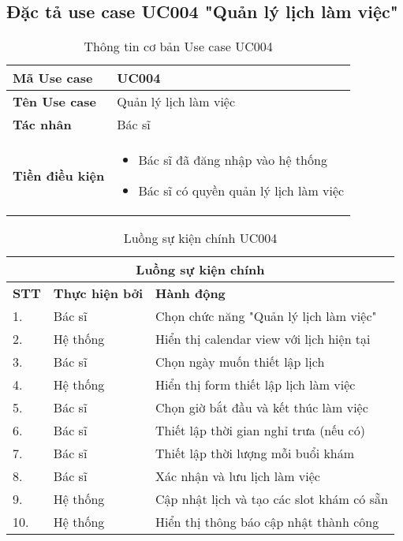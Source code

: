 \documentclass[../DoAn.tex]{subfiles}
\begin{document}
\subsection{Đặc tả use case UC004 "Quản lý lịch làm việc"}
\label{subsection:2.3.4}

\begin{table}[H]
\centering
\begin{tabular}{|p{3cm}|p{10cm}|}
\hline
\textbf{Mã Use case} & UC004 \\
\hline
\textbf{Tên Use case} & Quản lý lịch làm việc \\
\hline
\textbf{Tác nhân} & Bác sĩ \\
\hline
\textbf{Tiền điều kiện} & 
\begin{itemize}
    \item Bác sĩ đã đăng nhập vào hệ thống
    \item Bác sĩ có quyền quản lý lịch làm việc
\end{itemize} \\
\hline
\end{tabular}
\caption{Thông tin cơ bản Use case UC004}
\end{table}

\begin{table}[H]
\centering
\begin{tabular}{|p{1cm}|p{3cm}|p{9cm}|}
\hline
\multicolumn{3}{|c|}{\textbf{Luồng sự kiện chính}} \\
\hline
\textbf{STT} & \textbf{Thực hiện bởi} & \textbf{Hành động} \\
\hline
1. & Bác sĩ & Chọn chức năng "Quản lý lịch làm việc" \\
\hline
2. & Hệ thống & Hiển thị calendar view với lịch hiện tại \\
\hline
3. & Bác sĩ & Chọn ngày muốn thiết lập lịch \\
\hline
4. & Hệ thống & Hiển thị form thiết lập lịch làm việc \\
\hline
5. & Bác sĩ & Chọn giờ bắt đầu và kết thúc làm việc \\
\hline
6. & Bác sĩ & Thiết lập thời gian nghỉ trưa (nếu có) \\
\hline
7. & Bác sĩ & Thiết lập thời lượng mỗi buổi khám \\
\hline
8. & Bác sĩ & Xác nhận và lưu lịch làm việc \\
\hline
9. & Hệ thống & Cập nhật lịch và tạo các slot khám có sẵn \\
\hline
10. & Hệ thống & Hiển thị thông báo cập nhật thành công \\
\hline
\end{tabular}
\caption{Luồng sự kiện chính UC004}
\end{table}
\end{document}
